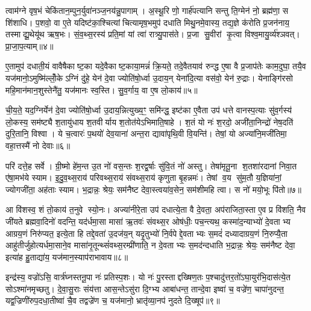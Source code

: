 {\anuvakamend[{ए॒नमे॒तदह्नो॒ऽष्टाच॑त्वारिशच्च॥१॥}]}

त्वाम॑ग्ने वृष॒भं चेकि॑तान॒म्पुन॒र्युवा॑नञ्ज॒नय॑न्नु॒पागाम्। अ॒स्थू॒रि णो॒ गार्\mbox{}ह॑पत्यानि सन्तु ति॒ग्मेन॑ नो॒ ब्रह्म॑णा॒ स शि॑शाधि। प॒शवो॒ वा ए॒ते यदिष्ट॑का॒श्चित्यांचित्यामृष॒भमुप॑ दधाति मिथु॒नमे॒वास्य॒ तद्य॒ज्ञे क॑रोति प्र॒जन॑नाय॒ तस्माद्यू॒थेयू॑थ ऋष॒भः। सं॒व॒थ्स॒रस्य॑ प्रति॒मां यां त्वा॑ रात्र्यु॒पास॑ते। प्र॒जा सु॒वीरां कृ॒त्वा विश्व॒मायु॒र्व्य॑श्ञवत्। प्रा॒जा॒प॒त्याम्॥४॥

ए॒तामुप॑ दधाती॒यं वावैषैकाष्ट॒का यदे॒वैकाष्ट॒काया॒मन्नं॑ क्रि॒यते॒ तदे॒वैतयाव॑ रुन्द्ध ए॒षा वै प्र॒जाप॑तेः काम॒दुघा॒ तयै॒व यज॑मानो॒ऽमुष्मि॑ल्लोँ॒केऽग्निं दु॑हे॒ येन॑ दे॒वा ज्योति॑षो॒र्ध्वा उ॒दाय॒न् येना॑दि॒त्या वस॑वो॒ येन॑ रु॒द्राः। येनाङ्गि॑रसो महि॒मान॑मान॒शुस्तेनै॑तु॒ यज॑मानः स्व॒स्ति। सु॒व॒र्गाय॒ वा ए॒ष लो॒काय॑॥५॥

ची॒य॒ते॒ यद॒ग्निर्येन॑ दे॒वा ज्योति॑षो॒र्ध्वा उ॒दाय॒न्नित्युख्य॒ꣳ॒ समि॑न्द्ध॒ इष्ट॑का ए॒वैता उप॑ धत्ते वानस्प॒त्याः सु॑व॒र्गस्य॑ लो॒कस्य॒ सम॑ष्ट्यै श॒तायु॑धाय श॒तवीर्याय श॒तोत॑येऽभिमाति॒षाहे। श॒तं यो नः॑ श॒रदो॒ अजी॑ता॒निन्द्रो॑ नेष॒दति॑ दुरि॒तानि॒ विश्वा। ये च॒त्वारः॑ प॒थयो॑ देव॒याना॑ अन्त॒रा द्यावा॑पृथि॒वी वि॒यन्ति॑। तेषां॒ यो अज्या॑नि॒मजी॑तिमा॒ वहा॒त्तस्मै॑ नो देवाः॥६॥

परि॑ दत्ते॒ह सर्वे। ग्री॒ष्मो हे॑म॒न्त उ॒त नो॑ वस॒न्तः श॒रद्व॒र्\mbox{}षाः सु॑वि॒तं नो॑ अस्तु। तेषा॑मृतू॒ना श॒तशा॑रदानां निवा॒त ए॑षा॒मभ॑ये स्याम। इ॒दु॒व॒थ्स॒राय॑ परिवथ्स॒राय॑ संवथ्स॒राय॑ कृणुता बृ॒हन्नमः॑। तेषां व॒य सु॑म॒तौ य॒ज्ञिया॑नां॒ ज्योगजी॑ता॒ अह॑ताः स्याम। भ॒द्रान्नः॒ श्रेयः॒ सम॑नैष्ट देवा॒स्त्वया॑व॒सेन॒ सम॑शीमहि त्वा। स नो॑ मयो॒भूः पि॑तो॥७॥

आ वि॑शस्व॒ शं तो॒काय॑ त॒नुवे स्यो॒नः। अज्या॑नीरे॒ता उप॑ दधात्ये॒ता वै दे॒वता॒ अप॑राजिता॒स्ता ए॒व प्र वि॑शति॒ नैव जी॑यते ब्रह्मवा॒दिनो॑ वदन्ति॒ यद॑र्धमा॒सा मासा॑ ऋ॒तवः॑ संवथ्स॒र ओष॑धीः॒ पच॒न्त्यथ॒ कस्मा॑द॒न्याभ्यो॑ दे॒वताभ्य आग्रय॒णं निरु॑प्यत॒ इत्ये॒ता हि तद्दे॒वता॑ उ॒दज॑य॒न् यदृ॒तुभ्यो॑ नि॒र्वपेद्दे॒वताभ्यः स॒मदं॑ दध्यादाग्रय॒णं नि॒रुप्यै॒ता आहु॑तीर्जुहोत्यर्धमा॒साने॒व मासा॑नृ॒तून्थ्सं॑वथ्स॒रम्प्री॑णाति॒ न दे॒वताभ्यः स॒मद॑न्दधाति भ॒द्रान्नः॒ श्रेयः॒ सम॑नैष्ट देवा॒ इत्या॑ह हु॒ताद्या॑य॒ यज॑मान॒स्याप॑राभावाय॥८॥

{\anuvakamend[{प्रा॒जा॒प॒त्याल्लोँ॒काय॑ देवाः पितो दध्यादाग्रय॒णं पञ्च॑विशतिश्च॥२॥}]}

इन्द्र॑स्य॒ वज्रो॑ऽसि॒ वार्त्र॑घ्नस्तनू॒पा नः॑ प्रतिस्प॒शः। यो नः॑ पु॒रस्ताद्दख्षिण॒तः प॒श्चादु॑त्तर॒तो॑ऽघा॒युर॑भि॒दास॑त्ये॒त सोऽश्मा॑नमृच्छतु। दे॒वा॒सु॒राः संय॑त्ता आस॒न्तेऽसु॑रा दि॒ग्भ्य आबा॑धन्त॒ तान्दे॒वा इष्वा॑ च॒ वज्रे॑ण॒ चापा॑नुदन्त॒ यद्व॒ज्रिणी॑रुप॒दधा॒तीष्वा॑ चै॒व तद्वज्रे॑ण च॒ यज॑मानो॒ भ्रातृ॑व्या॒नप॑ नुदते दि॒ख्षूप॑॥९॥

